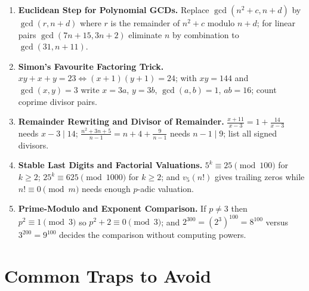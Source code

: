 \documentclass[11pt,a4paper]{article}
\begin{document}
\begin{enumerate}[leftmargin=2em, itemsep=4pt]
  \item \textbf{Euclidean Step for Polynomial GCDs.}
        Replace $\gcd(n^{2}+c,n+d)$ by $\gcd(r,n+d)$ where $r$ is the remainder of $n^{2}+c$ modulo $n+d$; for linear pairs $\gcd(7n+15,3n+2)$ eliminate $n$ by combination to $\gcd(31,n+11)$. 
  \item \textbf{Simon's Favourite Factoring Trick.}
        $xy+x+y=23\iff(x+1)(y+1)=24$; with $xy=144$ and $\gcd(x,y)=3$ write $x=3a$, $y=3b$, $\gcd(a,b)=1$, $ab=16$; count coprime divisor pairs. 
  \item \textbf{Remainder Rewriting and Divisor of Remainder.}
        $\frac{x+11}{x-3}=1+\frac{14}{x-3}$ needs $x-3\mid14$; $\frac{n^{2}+3n+5}{n-1}=n+4+\frac9{n-1}$ needs $n-1\mid9$; list all signed divisors. 
  \item \textbf{Stable Last Digits and Factorial Valuations.}
        $5^{k}\equiv25\pmod{100}$ for $k\ge2$; $25^{k}\equiv625\pmod{1000}$ for $k\ge2$; and $v_{5}(n!)$ gives trailing zeros while $n!\equiv0\pmod m$ needs enough $p$-adic valuation. 
  \item \textbf{Prime-Modulo and Exponent Comparison.}
        If $p\neq3$ then $p^{2}\equiv1\pmod3$ so $p^{2}+2\equiv0\pmod3$; and $2^{300}=(2^{3})^{100}=8^{100}$ versus $3^{200}=9^{100}$ decides the comparison without computing powers. 
\end{enumerate}

\section*{Common Traps to Avoid}
\end{document}
